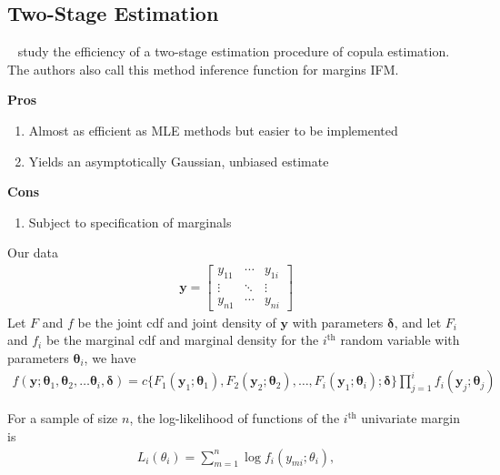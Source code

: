 

\subsection{Two-Stage Estimation}\label{subsec:two-stage-estimation}
~\cite{joe2005asymptotic} study the efficiency of a two-stage estimation procedure of copula estimation.
The authors also call this method inference function for margins IFM.

\textbf{Pros}
\begin{enumerate}
    \item Almost as efficient as MLE methods but easier to be implemented
    \item Yields an asymptotically Gaussian, unbiased estimate
\end{enumerate}

\textbf{Cons}
\begin{enumerate}
    \item Subject to specification of marginals \cite{kim2007comparison}
\end{enumerate}

Our data
\begin{align}
    \pmb{y} = \begin{bmatrix}
                  y_{11} & \cdots & y_{1i}\\
                  \vdots & \ddots & \vdots \\
                  y_{n1} & \cdots & y_{ni}
                  \end{bmatrix}
    \end{align}
Let $F$ and $f$ be the joint cdf and joint density of $\pmb{y}$ with parameters $\pmb{\delta}$,
and let $F_i$ and $f_i$ be the marginal cdf and marginal density for the $i^\text{th}$ random variable with parameters $\pmb{\theta}_i$, we have
\begin{align}
    f(\pmb{y}; \pmb{\theta}_1, \pmb{\theta}_2,\dots \pmb{\theta}_i, \pmb{\delta}) =
    c\{F_1(\pmb{y}_1;\pmb{\theta}_1), F_2(\pmb{y}_2; \pmb{\theta}_2), \dots, F_i(\pmb{y}_1;\pmb{\theta}_i); \pmb{\delta}\}
    \prod^i_{j=1}f_i(\pmb{y}_j;\pmb{\theta}_j)
    \end{align}

For a sample of size $n$, the log-likelihood of functions of the $i^\text{th}$ univariate margin is
\begin{align}
    L_i(\theta_i) = \sum^n_{m=1} \log f_i(y_{mi}; \theta_i),
    \end{align}

